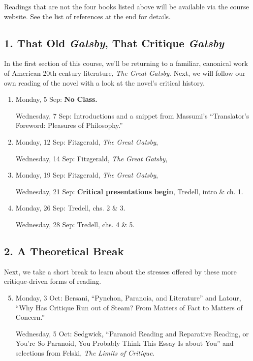 Readings that are not the four books listed above will be available via the
course website. See the list of references at the end for details.

\subsection*{1. That Old \textit{Gatsby}, That Critique \textit{Gatsby}}

  In the first section of this course, we’ll be returning to a familiar,
  canonical work of American 20th century literature, \textit{The Great
    Gatsby}. Next, we will follow our own reading of the novel with a look at
  the novel’s critical history. 

\begin{enumerate}

  \item Monday, 5 Sep: \textbf{No Class.}

    Wednesday, 7 Sep: Introductions and a snippet from Massumi’s “Translator’s Foreword: Pleasures of Philosophy.”

  \item Monday, 12 Sep: Fitzgerald, \textit{The Great Gatsby}, 

    Wednesday, 14 Sep: Fitzgerald, \textit{The Great Gatsby},

  \item Monday, 19 Sep: Fitzgerald, \textit{The Great Gatsby},

    Wednesday, 21 Sep: \textbf{\small Critical presentations begin}, Tredell, intro \& ch. 1.

  \item Monday, 26 Sep: Tredell, chs. 2 \& 3.

    Wednesday, 28 Sep: Tredell, chs. 4 \& 5.

\end{enumerate}

\subsection*{2. A Theoretical Break}

  Next, we take a short break to learn about the stresses offered by these more critique-driven forms of reading.

\begin{enumerate}
  \setcounter{enumi}{4}
 
  \item Monday, 3 Oct: Bersani, “Pynchon, Paranoia, and Literature” and Latour,
    “Why Has Critique Run out of Steam? From Matters of Fact to Matters of
    Concern.”

    Wednesday, 5 Oct: Sedgwick, “Paranoid Reading and Reparative Reading, or
    You’re So Paranoid, You Probably Think This Essay Is about You” and
    selections from Felski, \textit{The Limits of Critique}.
  
\end{enumerate}

